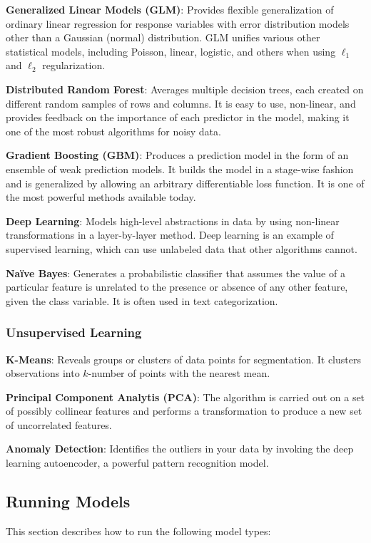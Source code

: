 {{\textbf{Generalized Linear Models (GLM)}}: Provides flexible generalization of ordinary linear regression for response variables with error distribution models other than a Gaussian (normal) distribution. GLM unifies various other statistical models, including Poisson, linear, logistic, and others when using $\ell_1$ and $\ell_2$ regularization.

{\textbf{Distributed Random Forest}}: Averages multiple decision trees, each created on different random samples of rows and columns. It is easy to use, non-linear, and provides feedback on the importance of each predictor in the model, making it one of the most robust algorithms for noisy data.

{\textbf{Gradient Boosting (GBM)}}: Produces a prediction model in the form of an ensemble of weak prediction models. It builds the model in a stage-wise fashion and is generalized by allowing an arbitrary differentiable loss function. It is one of the most powerful methods available today.

{\textbf{Deep Learning}}: Models high-level abstractions in data by using non-linear transformations in a layer-by-layer method. Deep learning is an example of supervised learning, which can use unlabeled data that other algorithms cannot.

{\textbf{Na\"{i}ve Bayes}}: Generates a probabilistic classifier that assumes the value of a particular feature is unrelated to the presence or absence of any other feature, given the class variable. It is often used in text categorization.

\subsubsection{Unsupervised Learning}
{\textbf{K-Means}}: Reveals groups or clusters of data points for segmentation. It clusters observations into $k$-number of points with the nearest mean.

{\textbf{Principal Component Analytis (PCA)}}: The algorithm is carried out on a set of possibly collinear features and performs a transformation to produce a new set of uncorrelated features.

{\textbf{Anomaly Detection}}: Identifies the outliers in your data by invoking the deep learning autoencoder, a powerful pattern recognition model.

\newpage

\subsection{Running Models}
This section describes how to run the following model types:

}
